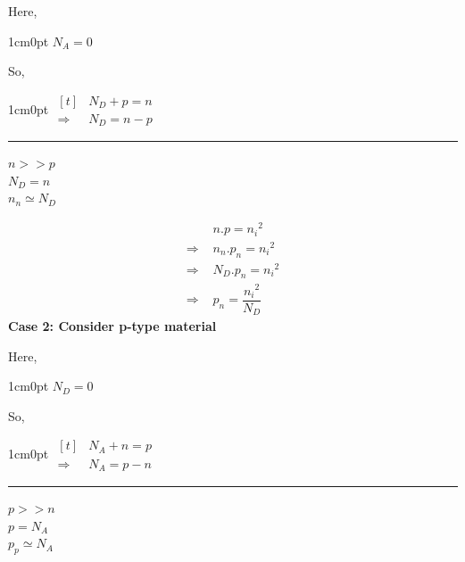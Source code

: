 \documentclass[a4aper,12pt]{report}
\begin{document}
\begin{center}\hspace*{2cm}
    \begin{minipage}{0.3\linewidth}
        Here, 
        \begin{adjustwidth}{1cm}{0pt}
            $N_A = 0$
        \end{adjustwidth}
        So, 
        \begin{adjustwidth}{1cm}{0pt}
            \hspace*{-0.5cm}
            $\begin{aligned}[t]
                & N_D + p = n \\
                \Rightarrow &N_D = n - p
            \end{aligned}$
        \end{adjustwidth}
    \end{minipage}
    \begin{minipage}{0.1\linewidth}
        \rule{1pt}{3cm}
    \end{minipage}
    \begin{minipage}{0.3\linewidth}
        $n >> p$ \\ [5pt]
        $N_D = n$ \\ [5pt]
        $n_n \simeq N_D$
    \end{minipage}
\end{center}
\vspace*{-10pt}
\begin{align*}
    &n.p = {n_i}^2 \\ 
    \Rightarrow\, \,&n_n.p_n = {n_i}^2\\
    \Rightarrow \,\,&N_D.p_n = {n_i}^2 \\
    \Rightarrow\, \, &p_n = \dfrac{{n_i}^2}{N_D}
\end{align*}
\textbf{Case 2: Consider p-type material} 
\begin{center}\hspace*{2cm}
    \begin{minipage}{0.3\linewidth}
        Here, 
        \begin{adjustwidth}{1cm}{0pt}
            $N_D = 0$
        \end{adjustwidth}
        So, 
        \begin{adjustwidth}{1cm}{0pt}
            \hspace*{-0.5cm}
            $\begin{aligned}[t]
                & N_A + n = p \\
                \Rightarrow &N_A = p - n
            \end{aligned}$
        \end{adjustwidth}
    \end{minipage}
    \begin{minipage}{0.1\linewidth}
        \rule{1pt}{3cm}
    \end{minipage}
    \begin{minipage}{0.3\linewidth}
        $p >> n$ \\ [5pt]
        $p = N_A$ \\ [5pt]
        $p_p \simeq N_A$
    \end{minipage}
\end{center}
\end{document}
